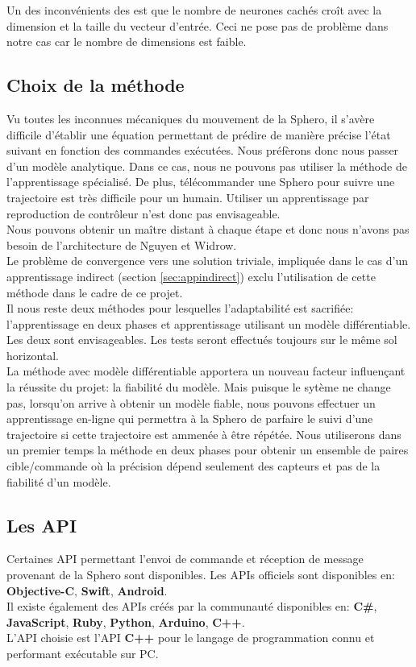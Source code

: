 \documentclass[12pt,a4paper,oneside, titlepage]{article}
\begin{document}
Un des inconvénients des \rbf est que le nombre de neurones cachés croît avec la dimension et la taille du vecteur d'entrée.
Ceci ne pose pas de problème dans notre cas car le nombre de dimensions est faible.

\subsection{Choix de la méthode}
Vu toutes les inconnues mécaniques du mouvement de la Sphero, il s'avère difficile d'établir une équation permettant de prédire de manière précise l'état suivant en fonction des commandes exécutées.
Nous préfèrons donc nous passer d'un modèle analytique.
Dans ce cas, nous ne pouvons pas utiliser la méthode de l'apprentissage spécialisé.
De plus, télécommander une Sphero pour suivre une trajectoire est très difficile pour un humain.
Utiliser un apprentissage par reproduction de contrôleur n'est donc pas envisageable.\\
Nous pouvons obtenir un maître distant à chaque étape et donc nous n'avons pas besoin de l'architecture de Nguyen et Widrow.\\
Le problème de convergence vers une solution triviale, impliquée dans le cas d'un apprentissage indirect (section \ref{sec:appindirect}) exclu l'utilisation de cette méthode dans le cadre de ce projet.\\

Il nous reste deux méthodes pour lesquelles l'adaptabilité est sacrifiée: l'apprentissage en deux phases et apprentissage utilisant un modèle différentiable.
Les deux sont envisageables. Les tests seront effectués toujours sur le même sol horizontal.\\

La méthode avec modèle différentiable apportera un nouveau facteur influençant la réussite du projet: la fiabilité du modèle.
Mais puisque le sytème ne change pas, lorsqu'on arrive à obtenir un modèle fiable, nous pouvons effectuer un apprentissage en-ligne qui permettra à la Sphero de parfaire le suivi d'une trajectoire si cette trajectoire est ammenée à être répétée.
Nous utiliserons dans un premier temps la méthode en deux phases pour obtenir un ensemble de paires cible/commande où la précision dépend seulement des capteurs et pas de la fiabilité d'un modèle.

\subsection{Les API}
Certaines API permettant l'envoi de commande et réception de message provenant de la Sphero sont disponibles.
Les APIs officiels sont disponibles en: \textbf{Objective-C}, \textbf{Swift}, \textbf{Android}.\cite{SDKofficiels}\\
Il existe également des APIs créés par la communauté disponibles en:\cite{gosphero} \textbf{C\#}, \textbf{JavaScript}, \textbf{Ruby}, \textbf{Python}\cite{pythonAPI}, \textbf{Arduino}, \textbf{C++}\cite{cppAPI}.\\
L'API choisie est l'API \textbf{C++} pour le langage de programmation connu et performant exécutable sur PC.
\end{document}

